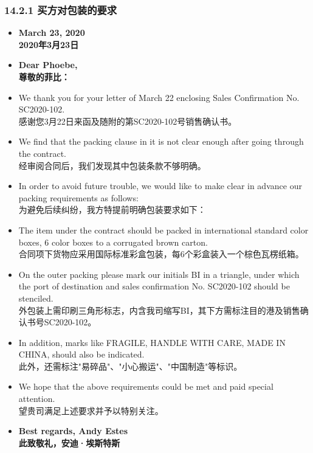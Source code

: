 \documentclass[12pt]{beamer}
\begin{document}
\begin{frame}[allowframebreaks]
    \frametitle{14.2.1 买方对包装的要求}
    \begin{itemize}
    \item \textbf{March 23, 2020} \\
    \textbf{2020年3月23日}
    
    \item \textbf{Dear Phoebe,} \\
    \textbf{尊敬的菲比：}
    
    \item We thank you for your letter of March 22 enclosing Sales Confirmation No. SC2020-102. \\
    感谢您3月22日来函及随附的第SC2020-102号销售确认书。
    
    \item We find that the packing clause in it is not clear enough after going through the contract. \\
    经审阅合同后，我们发现其中包装条款不够明确。
    
    \item In order to avoid future trouble, we would like to make clear in advance our packing requirements as follows: \\
    为避免后续纠纷，我方特提前明确包装要求如下：
    
    \item The item under the contract should be packed in international standard color boxes, 6 color boxes to a corrugated brown carton. \\
    合同项下货物应采用国际标准彩盒包装，每6个彩盒装入一个棕色瓦楞纸箱。
    
    \item On the outer packing please mark our initials BI in a triangle, under which the port of destination and sales confirmation No. SC2020-102 should be stenciled. \\
    外包装上需印刷三角形标志，内含我司缩写BI，其下方需标注目的港及销售确认书号SC2020-102。
    
    \item In addition, marks like FRAGILE, HANDLE WITH CARE, MADE IN CHINA, should also be indicated. \\
    此外，还需标注"易碎品"、"小心搬运"、"中国制造"等标识。
    
    \item We hope that the above requirements could be met and paid special attention. \\
    望贵司满足上述要求并予以特别关注。
    
    \item \textbf{Best regards, Andy Estes} \\
    \textbf{此致敬礼，安迪·埃斯特斯}
    \end{itemize}
    \end{frame}
\end{document}
